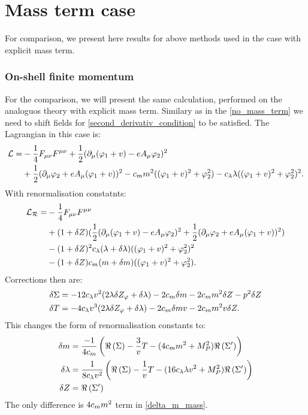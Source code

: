 \chapter{Mass term case}
For comparison, we present here results for above methods used in the case with explicit mass term.

\subsection{On-shell finite momentum}
For the comparison, we will present the same calculation, performed on the analoguos theory with 
explicit mass term. Similary as in the \ref{no_mass_term} we need to shift fields for 
\ref{second_derivativ_condition} to be satisfied. The Lagrangian in this case is:
\begin{align}\label{mass_term}
\mathcal{L} = &-\frac{1}{4}F_{\mu\nu}F^{\mu\nu}+ 
\frac{1}{2}(\partial_\mu(\varphi_1+v) - eA_\mu\varphi_2)^2\\
&+\frac{1}{2}(\partial_\mu\varphi_2+eA_\mu(\varphi_1+v))^2 - c_m m^2((\varphi_1+v)^2+\varphi_2^2)
-c_\lambda\lambda((\varphi_1+v)^2+\varphi_2^2)^2. \notag
\end{align}
With renormalisation constatnts:
\begin{align}
\mathcal{L_R} = &-\frac{1}{4}F_{\mu\nu}F^{\mu\nu} \\
&+(1+ \delta Z)(\frac{1}{2}(\partial_\mu(\varphi_1+v) - eA_\mu\varphi_2)^2
+\frac{1}{2}(\partial_\mu\varphi_2+eA_\mu(\varphi_1+v))^2) \notag \\
&-(1+\delta Z)^2c_\lambda(\lambda+\delta\lambda)((\varphi_1+v)^2+\varphi_2^2)^2  \notag \\
&-(1+\delta Z)c_m(m+\delta m)((\varphi_1+v)^2+\varphi_2^2).
\end{align}
Corrections then are:
\begin{align}
\delta\Sigma&=-12c_\lambda v^2(2\lambda\delta Z_\varphi+\delta\lambda)-2c_m\delta m-2c_m m^2\delta Z -p^2\delta Z \\
\delta T&=-4c_\lambda v^3(2\lambda\delta Z_\varphi+\delta\lambda)-2c_m\delta m v-2c_m m^2v\delta Z.
\end{align}
This changes the form of renormalisation constants to:
\begin{align}
\delta m &= \frac{-1}{4c_m}\left(\Re\left(\Sigma\right)-\frac{3}{v}T-(4c_m m^2+M_P^2)\Re\left(\Sigma'\right)
\right)\label{delta_m_mass}\\
\delta\lambda &= \frac{1}{8c_\lambda v^2}\left(\Re\left(\Sigma\right)-\frac{1}{v}T-(16c_\lambda\lambda v^2+M_P^2)
\Re\left(\Sigma'\right)
\right)\\
\delta Z &= \Re\left(\Sigma'\right)
\end{align}
The only difference is $4c_m m^2$ term in \ref{delta_m_mass}. 
